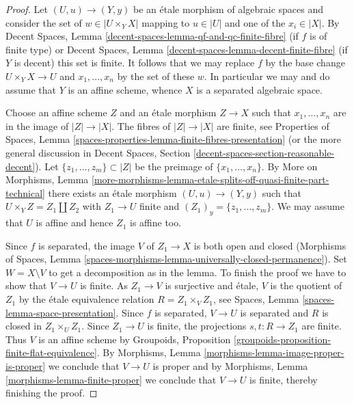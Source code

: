 \begin{proof}
Let $(U, u) \to (Y, y)$ be an \'etale morphism of algebraic spaces
and consider the set of  $w \in |U \times_Y X|$ mapping to $u \in |U|$
and one of the $x_i \in |X|$. By
Decent Spaces, Lemma \ref{decent-spaces-lemma-qf-and-qc-finite-fibre}
(if $f$ is of finite type) or
Decent Spaces, Lemma \ref{decent-spaces-lemma-decent-finite-fibre}
(if $Y$ is decent) this set is finite.
It follows that we may replace $f$ by the base change
$U \times_Y X \to U$ and $x_1, \ldots, x_n$ by the set of these $w$.
In particular we may and do assume that $Y$ is an affine scheme,
whence $X$ is a separated algebraic space.

\medskip\noindent
Choose an affine scheme $Z$ and an \'etale morphism $Z \to X$ such that
$x_1, \ldots, x_n$ are in the image of $|Z| \to |X|$. The fibres of
$|Z| \to |X|$ are finite, see Properties of Spaces, Lemma
\ref{spaces-properties-lemma-finite-fibres-presentation}
(or the more general discussion in Decent Spaces, Section
\ref{decent-spaces-section-reasonable-decent}).
Let $\{z_1, \ldots, z_m\} \subset |Z|$ be the preimage of
$\{x_1, \ldots, x_n\}$. By More on Morphisms, Lemma
\ref{more-morphisms-lemma-etale-splits-off-quasi-finite-part-technical}
there exists an \'etale morphism $(U, u) \to (Y, y)$ such
that $U \times_Y Z = Z_1 \amalg Z_2$ with $Z_1 \to U$ finite and
$(Z_1)_y = \{z_1, \ldots, z_m\}$. We may assume that $U$ is affine
and hence $Z_1$ is affine too.

\medskip\noindent
Since $f$ is separated, the image $V$ of $Z_1 \to X$ is both open and closed
(Morphisms of Spaces, Lemma
\ref{spaces-morphisms-lemma-universally-closed-permanence}).
Set $W = X \setminus V$ to get a decomposition as in the lemma.
To finish the proof we have to show that $V \to U$ is finite.
As $Z_1 \to V$ is surjective and \'etale, $V$ is the quotient of
$Z_1$ by the \'etale equivalence relation $R = Z_1 \times_V Z_1$, see
Spaces, Lemma \ref{spaces-lemma-space-presentation}.
Since $f$ is separated, $V \to U$ is separated and $R$ is closed in
$Z_1 \times_U Z_1$. Since $Z_1 \to U$ is finite,
the projections $s, t : R \to Z_1$ are finite.
Thus $V$ is an affine scheme by
Groupoids, Proposition \ref{groupoids-proposition-finite-flat-equivalence}.
By Morphisms, Lemma \ref{morphisms-lemma-image-proper-is-proper}
we conclude that $V \to U$ is proper and by
Morphisms, Lemma \ref{morphisms-lemma-finite-proper}
we conclude that $V \to U$ is finite,
thereby finishing the proof.
\end{proof}

